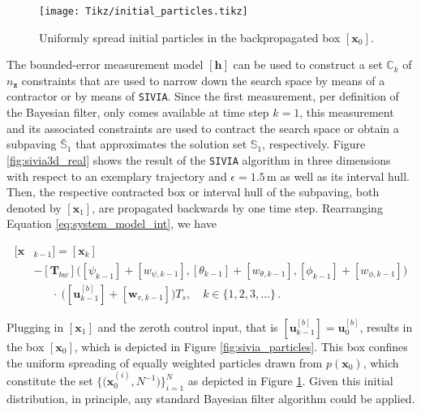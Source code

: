 \begin{figure}
	\centering
	\setlength{} 	
	\setlength{}		
	\texttt{[image: Tikz/initial\_particles.tikz]}	
	\caption[Uniformly spread initial particles in a backpropagated box.]{Uniformly spread initial particles in the backpropagated box $[\bm{x}_0]$.}		
	\label{fig:initial_particles}			
\end{figure}




The bounded-error measurement model $[\bm{h}]$ can be used to construct a set $\mathbb{C}_k$ of $n_{\bm{z}}$ constraints that are used to narrow down the search space by means of a contractor or by means of \texttt{SIVIA}. Since the first measurement, per definition of the Bayesian filter, only comes available at time step $k = 1$, this measurement and its associated constraints are used to contract the search space or obtain a subpaving $\bar{\mathbb{S}}_1$ that approximates the solution set $\mathbb{S}_1$, respectively. Figure \ref{fig:sivia3d_real} shows the result of the \texttt{SIVIA} algorithm in three dimensions with respect to an exemplary trajectory and $\epsilon = 1.5\,$m as well as its interval hull. Then, the respective contracted box or interval hull of the subpaving, both denoted by $[\bm{x}_{1}]$, are propagated backwards by one time step. Rearranging Equation \ref{eq:system_model_int}, we have

\begin{equation}\label{eq:system_model_int_back}
\begin{split}
  [\bm{x}&_{k-1}] = [\bm{x}_{k}] \\
  &- [\bm{T}_{bw}]\big([\psi_{k-1}] + [w_{\psi,{k-1}}], [\theta_{k-1}] + [w_{\theta,{k-1}}], [\phi_{k-1}] + [w_{\phi,{k-1}}]\big) \\
  &\mathrel{\phantom{iiii}}\: \cdot \: \big([\bm{u}^{[b]}_{k-1}] + [\bm{w}_{v, {k-1}}]\big) T_s, \quad k \in \{1, 2, 3, \dots\}\,.
  \end{split}
\end{equation}

\noindent
Plugging in $[\bm{x}_{1}]$ and the zeroth control input, that is $[\bm{u}^{[b]}_{k-1}] = \bm{u}^{[b]}_{0}$, results in the box $[\bm{x}_0]$, which is depicted in Figure \ref{fig:sivia_particles}. This box confines the uniform spreading of equally weighted particles drawn from $p(\bm{x}_0)$, which constitute the set $\big\{\big(\bm{x}^{(i)}_{0}, N^{-1}\big)\big\}_{i=1}^N$ as depicted in Figure \ref{fig:initial_particles}. Given this initial distribution, in principle, any standard Bayesian filter algorithm could be applied.
 
